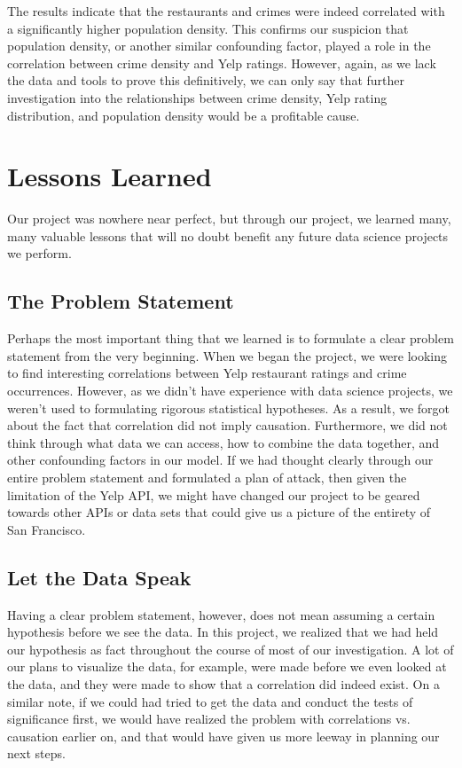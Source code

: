 \documentclass{article}
\begin{document}
The results indicate that the restaurants and crimes were indeed correlated
with a significantly higher population density. This confirms our suspicion
that population density, or another similar confounding factor, played a
role in the correlation between crime density and Yelp ratings. However,
again, as we lack the data and tools to prove this definitively, we can
only say that further investigation into the relationships between crime
density, Yelp rating distribution, and population density would be a
profitable cause.

\section{Lessons Learned}
\label{sec:lessons-learned}

Our project was nowhere near perfect, but through our project, we learned
many, many valuable lessons that will no doubt benefit any future data
science projects we perform.

\subsection{The Problem Statement}

Perhaps the most important thing that we learned is to formulate a clear
problem statement from the very beginning. When we began the project, we
were looking to find interesting correlations between Yelp restaurant
ratings and crime occurrences. However, as we didn't have experience with
data science projects, we weren't used to formulating rigorous statistical
hypotheses. As a result, we forgot about the fact that correlation did not
imply causation. Furthermore, we did not think through what data we can
access, how to combine the data together, and other confounding factors in
our model. If we had thought clearly through our entire problem statement
and formulated a plan of attack, then given the limitation of the Yelp API,
we might have changed our project to be geared towards other APIs or data
sets that could give us a picture of the entirety of San Francisco.

\subsection{Let the Data Speak}

Having a clear problem statement, however, does not mean assuming a certain
hypothesis before we see the data. In this project, we realized that we had
held our hypothesis as fact throughout the course of most of our
investigation. A lot of our plans to visualize the data, for example, were
made before we even looked at the data, and they were made to show that a
correlation did indeed exist. On a similar note, if we could had tried to
get the data and conduct the tests of significance first, we would have
realized the problem with correlations vs. causation earlier on, and that
would have given us more leeway in planning our next steps.
\end{document}
